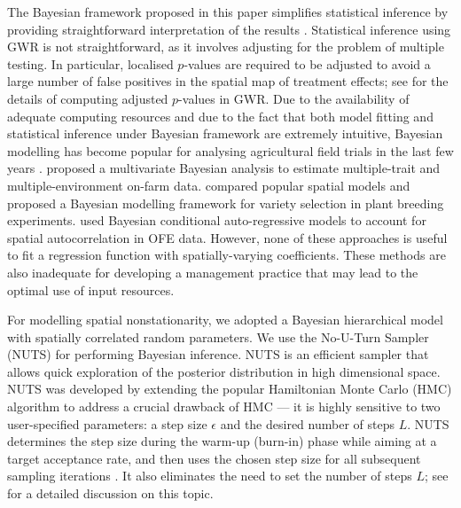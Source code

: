 \documentclass[a4paper]{article}   	%
\begin{document}
	
	The Bayesian framework proposed in this paper simplifies statistical inference by providing straightforward interpretation of the results \parencite{Che2010Bayesian}. Statistical inference using GWR is not straightforward, as it involves adjusting for the problem of multiple testing. In particular, localised $p$-values are required to be adjusted to avoid a large number of false positives in the spatial map of treatment effects; see \textcite{Rakshit2020Novel} for the details of computing adjusted $p$-values in GWR. Due to the availability of adequate computing resources and due to the fact that both model fitting and statistical inference under Bayesian framework are extremely intuitive, Bayesian modelling has become popular for analysing agricultural field trials in the last few years \parencite{Besag1999Bayesian, Theobald2002Bayesian, Che2010Bayesian, Donald2011Bayesian,  Montesinos-Lopez2018Multivariate, Selle2019Flexible, Shirley2020Empirical}. \textcite{Montesinos-Lopez2018Multivariate} proposed a multivariate Bayesian analysis to estimate multiple-trait and multiple-environment on-farm data. \textcite{Selle2019Flexible} compared popular spatial models and proposed a Bayesian modelling framework for variety selection in plant breeding experiments. \textcite{Jiang2009Bayesian} used Bayesian conditional auto-regressive models to account for spatial autocorrelation in OFE data. However, none of these approaches is useful to fit a regression function with spatially-varying coefficients. These methods are also inadequate for developing a management practice that may lead to the optimal use of input resources. 
	
	
	For modelling spatial nonstationarity, we adopted a Bayesian hierarchical model with spatially correlated random parameters. We use the No-U-Turn Sampler (NUTS) \parencite{Hoffman2014NoUturn} for performing Bayesian inference. NUTS is an efficient sampler that allows quick exploration of the posterior distribution in high dimensional space. NUTS was developed by extending the popular Hamiltonian Monte Carlo (HMC) algorithm to address a crucial drawback of HMC --- it is highly sensitive to two user-specified parameters: a step size $\epsilon$ and the desired number of steps $L$. NUTS determines the step size during the warm-up (burn-in) phase while aiming at a target acceptance rate, and then uses the chosen step size for all subsequent sampling iterations \parencite{Monnahan2017Faster}. It also eliminates the need to set the number of steps $L$; see \cite{Hoffman2014NoUturn} for a detailed discussion on this topic. 
	
\end{document}
